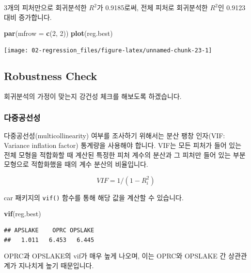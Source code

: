 \documentclass[12pt,]{book}
\newenvironment{Shaded}{\begin{snugshade}}{\end{snugshade}}
\newcommand{\DataTypeTok}[1]{\textcolor[rgb]{0.13,0.29,0.53}{#1}}
\newcommand{\DecValTok}[1]{\textcolor[rgb]{0.00,0.00,0.81}{#1}}
\newcommand{\KeywordTok}[1]{\textcolor[rgb]{0.13,0.29,0.53}{\textbf{#1}}}
\newcommand{\NormalTok}[1]{#1}
\begin{document}
3개의 피처만으로 회귀분석한 \(R^2\)가 0.9185로써, 전체 피처로 회귀분석한 \(R^2\)인 0.9123 대비 증가합니다.

\begin{Shaded}
\begin{Highlighting}[]
\KeywordTok{par}\NormalTok{(}\DataTypeTok{mfrow =} \KeywordTok{c}\NormalTok{(}\DecValTok{2}\NormalTok{, }\DecValTok{2}\NormalTok{))}
\KeywordTok{plot}\NormalTok{(reg.best)}
\end{Highlighting}
\end{Shaded}

\begin{center}\texttt{[image: 02-regression\_files/figure-latex/unnamed-chunk-23-1]} \end{center}

\hypertarget{robustness-check}{%
\subsection{Robustness Check}\label{robustness-check}}

회귀분석의 가정이 맞는지 강건성 체크를 해보도록 하겠습니다.

\hypertarget{uxb2e4uxc911uxacf5uxc120uxc131}{%
\subsubsection{다중공선성}\label{uxb2e4uxc911uxacf5uxc120uxc131}}

다중공선성(multicollinearity) 여부를 조사하기 위해서는 분산 팽창 인자(VIF: Variance inflation factor) 통계량을 사용해야 합니다. VIF는 모든 피처가 들어 있는 전체 모형을 적합화할 때 계산된 특정한 피처 계수의 분산과 그 피처만 들어 있는 부분 모형으로 적합화했을 때의 계수 분산의 비율입니다.

\[VIF = 1 / (1 - R^2_i)\]

car 패키지의 \texttt{vif()} 함수를 통해 해당 값을 계산할 수 있습니다.

\begin{Shaded}
\begin{Highlighting}[]
\KeywordTok{vif}\NormalTok{(reg.best)}
\end{Highlighting}
\end{Shaded}

\begin{verbatim}
## APSLAKE    OPRC OPSLAKE 
##   1.011   6.453   6.445
\end{verbatim}

OPRC과 OPSLAKE의 vif가 매우 높게 나오며, 이는 OPRC와 OPSLAKE 간 상관관계가 지나치게 높기 때문입니다.
\end{document}
